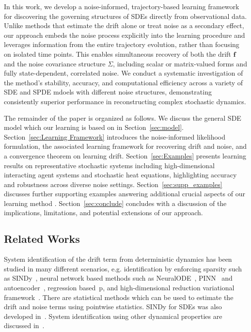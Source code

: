 \documentclass[11pt]{article} %
\def\vf{{\bm{f}}}
\begin{document}
In this work, we develop a noise-informed, trajectory-based learning framework for discovering the governing structures of SDEs directly from observational data. Unlike methods that estimate the drift alone or treat noise as a secondary effect, our approach embeds the noise process explicitly into the learning procedure and leverages information from the entire trajectory evolution, rather than focusing on isolated time points. This enables simultaneous recovery of both the drift $\vf$ and the noise covariance structure $\Sigma$, including scalar or matrix-valued forms and fully state-dependent, correlated noise. We conduct a systematic investigation of the method’s stability, accuracy, and computational efficiency across a variety of SDE and SPDE mdoels with different noise structures, demonstrating consistently superior performance in reconstructing complex stochastic dynamics.

The remainder of the paper is organized as follows.  We discuss the general SDE model which our learning is based on in Section~\ref{sec:model}.  Section~\ref{sec:Learning Framework} introduces the noise-informed likelihood formulation, the associated learning framework for recovering drift and noise, and a convergence theorem on learning drift. Section~\ref{sec:Examples} presents learning results on representative stochastic systems including high-dimensional interacting agent systems and stochastic heat equations, highlighting accuracy and robustness across diverse noise settings. Section~\ref{sec:supp_examples} discusses further supporting examples answering additional crucial aspects of our learning method . Section~\ref{sec:conclude} concludes with a discussion of the implications, limitations, and potential extensions of our approach.
%
\subsection{Related Works}\label{sec:Comparison}
%
System identification of the drift term from deterministic dynamics has been studied in many different scenarios, e.g. identification by enforcing sparsity such as SINDy~\citep{sindy}, neural network based methods such as NeuralODE~\citep{chen2018neural}, PINN~\citep{pinn2019} and autoencoder~\citep{xu2023modeling}, regression based~\cite{CS02}p, and high-dimensional reduction variational framework~\citep{LZTM2019}.  There are statistical methods which can be used to estimate the drift and noise terms using pointwise statistics.  SINDy for SDEs was also developed in~\citep{wanner2024higher}.  System identification using other dynamical properties are discussed in~\citep{HER2024, MIS2023}.
\end{document}
